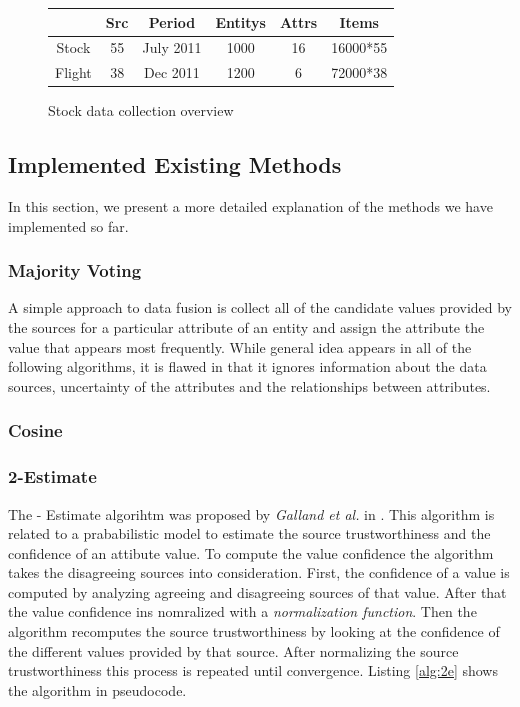 \documentclass{acm_proc_article-sp}
\begin{document}
\begin{figure}[h]
    \centering
{%
\begin{tabular}{  | c | c | c | c  | c | c |}		
\hline
\textbf{} & \textbf{Src} & \textbf{Period} & \textbf{Entitys} & \textbf{Attrs}  & \textbf{Items}  \\
\hline
 Stock & 55 & July 2011 &  1000 & 16 &  16000*55   \\
 Flight & 38 & Dec 2011 &  1200 & 6 &  72000*38   \\
\hline
\end{tabular}
}
 \caption{Stock data collection overview}%
    \label{fig:stock}%
\end{figure}

\subsection{Implemented Existing Methods}

In this section, we present a more detailed explanation of the methods we have implemented so far. 

\subsubsection{Majority Voting}

A simple approach to data fusion is collect all of the candidate values provided by the sources for a particular attribute of an entity and assign the attribute the value that appears most frequently. While general idea appears in all of the following   algorithms,  it is flawed in that it ignores information about the data sources, uncertainty of the attributes and the relationships between  attributes.

\subsubsection{Cosine}

\subsubsection{2-Estimate}
The {- Estimate} algorihtm was proposed by \emph{Galland et al.} in \cite{galland:corro}. This algorithm is related to a prababilistic model to estimate the source trustworthiness and the confidence of an attibute value. To compute the value confidence the algorithm takes the disagreeing sources into consideration. First, the confidence of a value is computed by analyzing agreeing and disagreeing sources of that value. After that the value confidence ins nomralized with a \emph{normalization function}. Then the algorithm recomputes the source trustworthiness by looking at the confidence of the different values provided by that source. After normalizing the source trustworthiness this process is repeated until convergence. Listing \ref{alg:2e} shows the algorithm in pseudocode.
\end{document}

